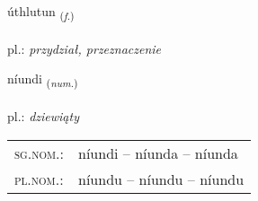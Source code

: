 \documentclass[frontgrid, backgrid]{flacards}\usepackage[]{graphicx}\usepackage[]{xcolor}
\begin{document}
\renewcommand{\flhead}{\vskip5pt \fboxsep=0pt {\small\bfseries\footnotesize Nafnorð | rzeczownik}}
\renewcommand{\fcfoot}{\vskip5pt \fboxsep=0pt \hspace{2pt}{\small\bfseries\footnotesize 3K}}

\renewcommand{\blhead}{\vskip5pt {\small\bfseries\footnotesize Nafnorð | rzeczownik }}
\renewcommand{\bcfoot}{\vskip5pt \hspace{2pt}{\small\bfseries\footnotesize 3K}}


{úthlutun \small{\textsubscript{(\textit{f.})}} \\[1ex] %
 \\
pl.: \emph{przydział, przeznaczenie} \\  [2ex]
\renewcommand*{\arraystretch}{0.8}
}

\renewcommand{\flhead}{\vskip5pt \fboxsep=0pt {\small\bfseries\footnotesize Töluorð | liczebnik}}
\renewcommand{\fcfoot}{\vskip5pt \fboxsep=0pt \hspace{2pt}{\small\bfseries\footnotesize 3K}}

\renewcommand{\blhead}{\vskip5pt {\small\bfseries\footnotesize Töluorð | liczebnik }}
\renewcommand{\bcfoot}{\vskip5pt \hspace{2pt}{\small\bfseries\footnotesize 3K}}


{níundi \small{\textsubscript{(\textit{num.})}} \\[1ex] %
\textphonetic{[nijʏntɪ]} \\
pl.: \emph{dziewiąty} \\  [2ex]
\renewcommand*{\arraystretch}{0.8}
\begin{tabular}{ll}
\textsc{sg.nom.}: & níundi  --  níunda -- níunda \\ 
\textsc{pl.nom.}: & níundu -- níundu -- níundu
\end{tabular}
}
\end{document}
